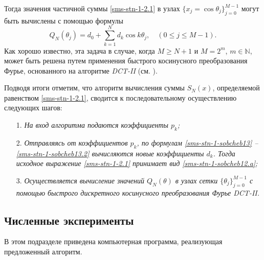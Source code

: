 Тогда  значения частичной суммы  \eqref{sms-stn-1-2.1} в узлах $\{x_j = \cos\theta_j\}_{j=0}^{M-1}$ %
могут быть вычислены с помощью формулы
\begin{equation}\label{sms-stn-1-sobcheb12.a}
Q_N(\theta_j) =
d_{0} + \sum_{k=1}^{N}  d_{k} \cos{k \theta_j}, \quad (0\le j\le M-1).
\end{equation}
Как хорошо известно, эта задача
в случае, когда $M \ge N+1$ и $M=2^{m}$, $m \in \mathbb{N}$,
может быть решена путем применения быстрого косинусного преобразования Фурье, основанного на алгоритме \textit{DCT-II} (см. \cite{sms-stn-1-dctBook}).

Подводя итоги отметим, что алгоритм вычисления суммы $S_N(x)$, определяемой равенством \eqref{sms-stn-1-2.1}, сводится к последовательному осуществлению следующих шагов:

\begin{enumerate}
	\item[1.] \textit{
		На вход алгоритма подаются коэффициенты $p_{k}$;
	}
	\item[2.] \textit{
		Отправляясь от коэффициентов $p_{k}$, по формулам \eqref{sms-stn-1-sobcheb13} -- \eqref{sms-stn-1-sobcheb13.2} вычисляются новые коэффициенты $ d_{k}$.
		Тогда исходное выражение \eqref{sms-stn-1-2.1} принимает вид \eqref{sms-stn-1-sobcheb12.a};
	}
	\item[3.] \textit{
		Осуществляется вычисление значений $Q_N(\theta)$ в узлах сетки $\{\theta_j\}_{j=0}^{M-1}$ с помощью быстрого дискретного косинусного преобразования Фурье DCT-II.
	}
\end{enumerate}

\subsection{Численные эксперименты}
В этом подразделе приведена компьютерная программа, реализующая предложенный алгоритм.

